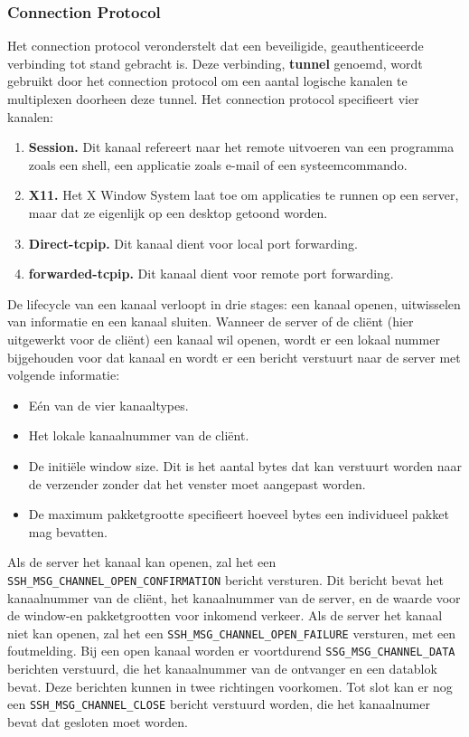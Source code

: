 \documentclass{report}
\begin{document}
	\subsubsection{Connection Protocol}
	Het connection protocol veronderstelt dat een beveiligide, geauthenticeerde verbinding tot stand gebracht is. Deze verbinding, \textbf{tunnel} genoemd, wordt gebruikt door het connection protocol om een aantal logische kanalen te multiplexen doorheen deze tunnel. Het connection protocol specifieert vier kanalen:
	\begin{enumerate}
		\item \textbf{Session.} Dit kanaal refereert naar het remote uitvoeren van een programma zoals een shell, een applicatie zoals e-mail of een systeemcommando. 
		\item \textbf{X11.} Het X Window System laat toe om applicaties te runnen op een server, maar dat ze eigenlijk op een desktop getoond worden.
		\item \textbf{Direct-tcpip.} Dit kanaal dient voor local port forwarding.
		\item \textbf{forwarded-tcpip.} Dit kanaal dient voor remote port forwarding.
	\end{enumerate}
	De lifecycle van een kanaal verloopt in drie stages: een kanaal openen, uitwisselen van informatie en een kanaal sluiten. Wanneer de server of de cliënt (hier uitgewerkt voor de cliënt) een kanaal wil openen, wordt er een lokaal nummer bijgehouden voor dat kanaal en wordt er een bericht verstuurt naar de server met volgende informatie: 
	\begin{itemize}
		\item Eén van de vier kanaaltypes. 
		\item Het lokale kanaalnummer van de cliënt.
		\item De initiële window size. Dit is het aantal bytes dat kan verstuurt worden naar de verzender zonder dat het venster moet aangepast worden.
		\item De maximum pakketgrootte specifieert hoeveel bytes een individueel pakket mag bevatten.
	\end{itemize}
	Als de server het kanaal kan openen, zal het een \texttt{SSH\_MSG\_CHANNEL\_OPEN\_CONFIRMATION} bericht versturen. Dit bericht bevat het kanaalnummer van de cliënt, het kanaalnummer van de server, en de waarde voor de window-en pakketgrootten voor inkomend verkeer. Als de server het kanaal niet kan openen, zal het een \texttt{SSH\_MSG\_CHANNEL\_OPEN\_FAILURE} versturen, met een foutmelding. Bij een open kanaal worden er voortdurend \texttt{SSG\_MSG\_CHANNEL\_DATA} berichten verstuurd, die het kanaalnummer van de ontvanger en een datablok bevat. Deze berichten kunnen in twee richtingen voorkomen. Tot slot kan er nog een \texttt{SSH\_MSG\_CHANNEL\_CLOSE} bericht verstuurd worden, die het kanaalnumer bevat dat gesloten moet worden.
	
\end{document}
